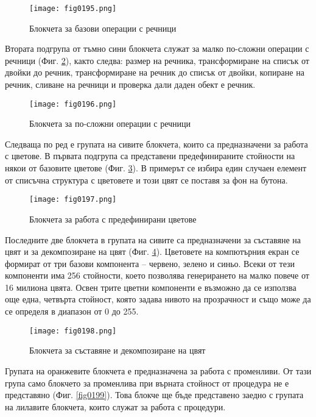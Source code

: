\begin{figure}[H]
  \centering
  \texttt{[image: fig0195.png]}
  \caption{Блокчета за базови операции с речници}
\label{fig0195}
\end{figure}

Втората подгрупа от тъмно сини блокчета служат за малко по-сложни операции с речници (Фиг. \ref{fig0196}), както следва: размер на речника, трансформиране на списък от двойки до речник, трансформиране на речник до списък от двойки, копиране на речник, сливане на речници и проверка дали даден обект е речник.

\begin{figure}[H]
  \centering
  \texttt{[image: fig0196.png]}
  \caption{Блокчета за по-сложни операции с речници}
\label{fig0196}
\end{figure}

Следваща по ред е групата на сивите блокчета, които са предназначени за работа с цветове. В първата подгрупа са представени предефинираните стойности на някои от базовите цветове (Фиг. \ref{fig0197}). В примерът се избира един случаен елемент от списъчна структура с цветовете и този цвят се поставя за фон на бутона.

\begin{figure}[H]
  \centering
  \texttt{[image: fig0197.png]}
  \caption{Блокчета за работа с предефинирани цветове}
\label{fig0197}
\end{figure}

Последните две блокчета в групата на сивите са предназначени за съставяне на цвят и за декомпозиране на цвят (Фиг. \ref{fig0198}). Цветовете на компютърния екран се формират от три базови компонента – червено, зелено и синьо. Всеки от тези компоненти има 256 стойности, което позволява генерирането на малко повече от 16 милиона цвята. Освен трите цветни компоненти е възможно да се използва още една, четвърта стойност, която задава нивото на прозрачност и също може да се определя в диапазон от 0 до 255.

\begin{figure}[H]
  \centering
  \texttt{[image: fig0198.png]}
  \caption{Блокчета за съставяне и декомпозиране на цвят}
\label{fig0198}
\end{figure}

Групата на оранжевите блокчета е предназначена за работа с променливи. От тази група само блокчето за променлива при върната стойност от процедура не е представяно (Фиг. \ref{fig0199}). Това блокче ще бъде представено заедно с групата на лилавите блокчета, които служат за работа с процедури.

